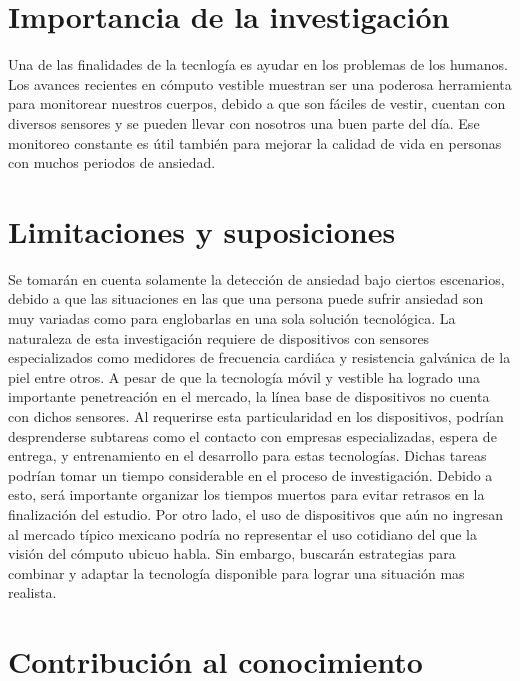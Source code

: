 \documentclass[letterpaper,12pt]{cicese}
\begin{document}
		\chapter{Importancia de la investigaci\'on}
				Una de las finalidades de la tecnlog\'ia es ayudar en los problemas de los humanos. Los avances recientes en c\'omputo vestible muestran
				ser una poderosa herramienta para monitorear nuestros cuerpos, debido a que son f\'aciles de vestir, cuentan con diversos sensores y se pueden
				llevar con nosotros una buen parte del d\'ia. Ese monitoreo constante es \'util tambi\'en para mejorar la calidad de vida en personas con muchos periodos de ansiedad. %
				
					\chapter{Limitaciones y suposiciones}
			Se tomar\'an en cuenta solamente la detecci\'on de ansiedad bajo ciertos escenarios, debido a que las situaciones en las que una persona puede sufrir ansiedad son muy variadas como para englobarlas en una sola soluci\'on tecnol\'ogica.
			La naturaleza de esta investigaci\'on requiere de dispositivos con sensores especializados como medidores de frecuencia cardi\'aca y resistencia galv\'anica de la piel entre otros. A pesar de que la tecnolog\'ia m\'ovil y vestible ha logrado una importante penetreaci\'on en el mercado, la l\'inea base de dispositivos no cuenta con dichos sensores. Al requerirse esta particularidad en los dispositivos, podr\'ian desprenderse subtareas como el contacto con empresas especializadas, espera de entrega, y entrenamiento en el desarrollo para estas tecnolog\'ias. Dichas tareas podr\'ian tomar un tiempo considerable en el proceso de investigaci\'on. Debido a esto, ser\'a importante organizar los tiempos muertos para evitar retrasos en la finalizaci\'on del estudio.
			Por otro lado, el uso de dispositivos que a\'un no ingresan al mercado t\'ipico mexicano podr\'ia no representar el uso cotidiano del que la visi\'on del  c\'omputo ubicuo habla. Sin embargo, buscar\'an estrategias para combinar y adaptar la tecnolog\'ia disponible para lograr una situaci\'on mas realista.
		\chapter{Contribuci\'on al conocimiento}
\end{document}
